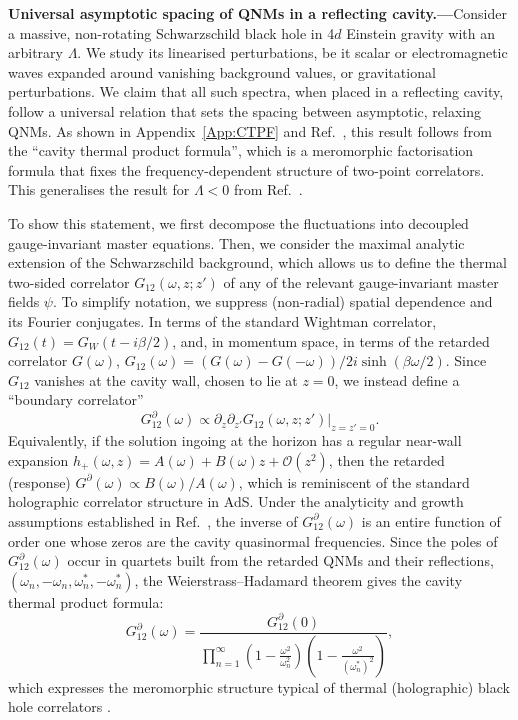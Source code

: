 \documentclass[prd,aps,twocolumn,amsfonts,showpacs,superscriptaddress,preprintnumbers,nofootinbib]{revtex4-2}
\begin{document}
{\bf Universal asymptotic spacing of QNMs in a reflecting cavity.---}Consider a massive, non-rotating Schwarzschild black hole in 4$d$ Einstein gravity with an arbitrary $\Lambda$. We study its linearised perturbations, be it scalar or electromagnetic waves expanded around vanishing background values, or gravitational perturbations. We claim that all such spectra, when placed in a reflecting cavity, follow a universal relation that sets the spacing between asymptotic, relaxing QNMs. As shown in Appendix~\ref{App:CTPF} and Ref.~\cite{Grozdanov:2026ktq}, this result follows from the ``cavity thermal product formula'', which is a meromorphic factorisation formula that fixes the frequency-dependent structure of two-point correlators. This generalises the result for $\Lambda < 0$ from Ref.~\cite{dodelson2023thermal}. 

To show this statement, we first decompose the fluctuations into decoupled gauge-invariant master equations. Then, we consider the maximal analytic extension of the Schwarzschild background, which allows us to define the thermal two-sided correlator $G_{12}(\omega,z;z')$ of any of the relevant gauge-invariant master fields $\psi$. To simplify notation, we suppress (non-radial) spatial dependence and its Fourier conjugates. In terms of the standard Wightman correlator, $G_{12}(t) = G_W(t-i\beta/2)$, and, in momentum space, in terms of the retarded correlator $G(\omega)$, $G_{12}(\omega) = (G(\omega)-G(-\omega))/ 2i\sinh(\beta\omega/2)$. Since $G_{12}$ vanishes at the cavity wall, chosen to lie at $z=0$, we instead define a ``boundary correlator''
\begin{equation}
\label{eq:wall-correlator-definition}
    G_{12}^{\partial}(\omega)
    \propto
    \left.
    \partial_z\partial_{z'}G_{12}(\omega,z;z')
    \right|_{z=z'=0}.
\end{equation}
Equivalently, if the solution ingoing at the horizon has a regular near-wall
expansion
$h_+(\omega,z)=A(\omega)+B(\omega)z+\mathcal O(z^2)$, then the retarded (response) $G^{\partial}(\omega) \propto B(\omega)/A(\omega)$, which is reminiscent of the standard holographic correlator structure in AdS. Under the analyticity and growth assumptions established in Ref.~\cite{Grozdanov:2026ktq}, the inverse of
$G_{12}^{\partial}(\omega)$ is an entire function of order one whose
zeros are the cavity quasinormal frequencies. Since the poles of $G_{12}^{\partial}(\omega)$ occur in quartets
built from the retarded QNMs and their reflections,
$(\omega_n,-\omega_n,\omega_n^*,-\omega_n^*)$, the
Weierstrass--Hadamard theorem gives the cavity thermal product formula:
\begin{equation}
\label{eq: CTPF}
    G_{12}^{\partial}(\omega)
    = \frac{G_{12}^{\partial}(0)}
    {\displaystyle\prod_{n=1}^{\infty}
    \left(1-\frac{\omega^2}{\omega_n^2}\right)
    \left(1-\frac{\omega^2}{(\omega_n^*)^2}\right)} ,
\end{equation}
which expresses the meromorphic structure typical of thermal (holographic) black hole correlators \cite{Kovtun:2005ev,Hartnoll:2005ju,Grozdanov:2016vgg,Grozdanov:2018gfx,dodelson2023thermal}. 
\end{document}
